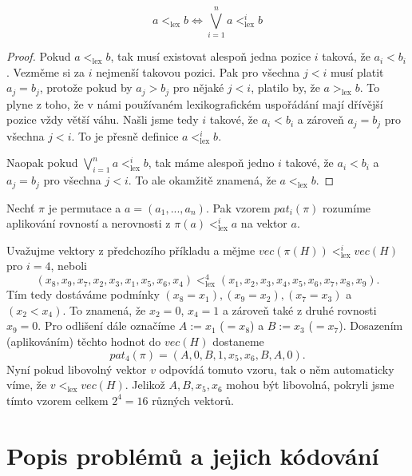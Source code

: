 \begin{lemma}
$$a <_{\text{lex}} b \Leftrightarrow \bigvee_{i=1}^{n} a <_{\text{lex}}^{i} b$$
\end{lemma}

\begin{proof}
Pokud $a <_{\text{lex}} b$, tak musí existovat alespoň jedna pozice $i$ taková, že $a_i < b_i$. Vezměme si za $i$ nejmenší takovou pozici. Pak pro všechna $j<i$ musí platit $a_j = b_j$, protože pokud by $a_j > b_j$ pro nějaké $j < i$, platilo by, že $a >_{\text{lex}} b$. To plyne z toho, že v námi používaném lexikografickém uspořádání mají dřívější pozice vždy větší váhu. Našli jsme tedy $i$ takové, že $a_i < b_i$ a zároveň $a_j = b_j$ pro všechna $j < i$. To je přesně definice $a <_{\text{lex}}^{i} b$.

Naopak pokud $\bigvee_{i=1}^{n} a <_{\text{lex}}^{i} b$, tak máme alespoň jedno $i$ takové, že $a_i < b_i$ a $a_j = b_j$ pro všechna $j < i$. To ale okamžitě znamená, že $a <_{\text{lex}} b$.
\end{proof}

\begin{definice}
Nechť $\pi$ je permutace a $a = (a_1,...,a_n)$. Pak vzorem $pat_i(\pi)$ rozumíme aplikování rovností a nerovnosti z $\pi(a) <_{\text{lex}}^{i} a$ na vektor $a$.
\end{definice}

\begin{prikl}
Uvažujme vektory z předchozího příkladu a mějme $vec(\pi(H)) <_{\text{lex}}^{i} vec(H)$ pro $i=4$, neboli 
$$(x_8, x_9, x_7, x_2, x_3, x_1, x_5, x_6, x_4) <_{\text{lex}}^{4} (x_1, x_2, x_3, x_4, x_5, x_6, x_7, x_8, x_9).$$
Tím tedy dostáváme podmínky $(x_8 = x_1), (x_9 = x_2), (x_7 = x_3)$ a $(x_2 < x_4)$. To znamená, že $x_2 = 0$, $x_4 = 1$ a zároveň také z druhé rovnosti $x_9 = 0$. Pro odlišení dále označíme $A := x_1$ ($=x_8$) a $B := x_3$ ($=x_7$). Dosazením (aplikováním) těchto hodnot do $vec(H)$ dostaneme 
$$pat_4(\pi) = (A, 0, B, 1, x_5, x_6, B, A, 0).$$
Nyní pokud libovolný vektor $v$ odpovídá tomuto vzoru, tak o něm automaticky víme, že $v <_{\text{lex}} vec(H)$. Jelikož $A, B, x_5, x_6$ mohou být libovolná, pokryli jsme tímto vzorem celkem $2^4 = 16$ různých vektorů.
\end{prikl}

\section{Popis problémů a jejich kódování}
